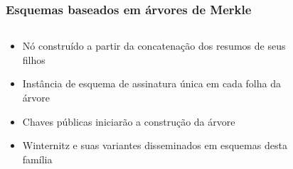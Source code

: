\documentclass[12pt]{beamer}
\newcommand{\hash}[2][]{\mathcal{H}^{#1} (#2)}
\newcommand{\concat}{\, \vert{} \vert{} \,}
\begin{document}
\begin{frame}
  \frametitle{Esquemas baseados em árvores de Merkle}
  \begin{columns}[T]
    \begin{column}{.45\textwidth}
      \begin{itemize}
        \item Nó construído a partir da concatenação dos resumos de seus filhos
        \item Instância de esquema de assinatura única em cada folha da árvore
        \item Chaves públicas iniciarão a construção da árvore
        \item Winternitz e suas variantes disseminados em esquemas desta família
      \end{itemize}
    \end{column}
    \begin{column}{.4\textwidth}
      \begin{figure}
      \end{figure}
    \end{column}
  \end{columns}
\end{frame}
\end{document}
